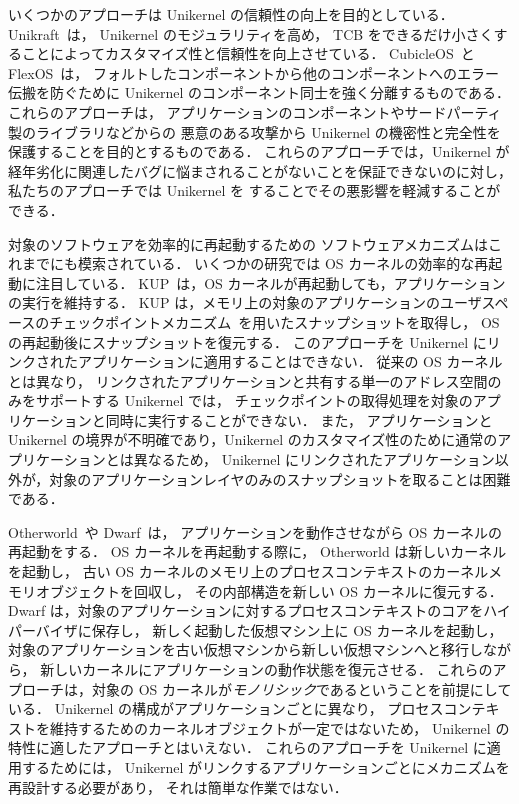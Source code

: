 いくつかのアプローチは Unikernel の信頼性の向上を目的としている．
Unikraft~\cite{KuenzerEtAl-Unikraft}は，
Unikernel のモジュラリティを高め，
TCB をできるだけ小さくすることによってカスタマイズ性と信頼性を向上させている．
CubicleOS~\cite{SartakovEtAl-ASPLOS21}と FlexOS~\cite{LefeuvreEtAl-FlexOS}は，
フォルトしたコンポーネントから他のコンポーネントへのエラー伝搬を防ぐために
Unikernel のコンポーネント同士を強く分離するものである．
これらのアプローチは，
アプリケーションのコンポーネントやサードパーティ製のライブラリなどからの
悪意のある攻撃から Unikernel の機密性と完全性を保護することを目的とするものである．
これらのアプローチでは，Unikernel が経年劣化に関連したバグに悩まされることがないことを保証できないのに対し，
私たちのアプローチでは Unikernel を \rr することでその悪影響を軽減することができる．


対象のソフトウェアを効率的に再起動するための
ソフトウェアメカニズムはこれまでにも模索されている．
いくつかの研究では OS カーネルの効率的な再起動に注目している．
KUP~\cite{KashyapEtAl-KUP}は，OS カーネルが再起動しても，アプリケーションの実行を維持する．
KUP は，メモリ上の対象のアプリケーションのユーザスペースのチェックポイントメカニズム~\cite{CRIU}を用いたスナップショットを取得し，
OS の再起動後にスナップショットを復元する．
このアプローチを Unikernel にリンクされたアプリケーションに適用することはできない．
従来の OS カーネルとは異なり，
リンクされたアプリケーションと共有する単一のアドレス空間のみをサポートする Unikernel では，
チェックポイントの取得処理を対象のアプリケーションと同時に実行することができない．
また，
アプリケーションと Unikernel の境界が不明確であり，Unikernel のカスタマイズ性のために通常のアプリケーションとは異なるため，
Unikernel にリンクされたアプリケーション以外が，対象のアプリケーションレイヤのみのスナップショットを取ることは困難である．


Otherworld~\cite{DepoutovitchEtAl-otherworld}や Dwarf~\cite{TeradaEtAl-Dwarf}は，
アプリケーションを動作させながら OS カーネルの再起動をする．
OS カーネルを再起動する際に，
Otherworld は新しいカーネルを起動し，
古い OS カーネルのメモリ上のプロセスコンテキストのカーネルメモリオブジェクトを回収し，
その内部構造を新しい OS カーネルに復元する．
Dwarf は，対象のアプリケーションに対するプロセスコンテキストのコアをハイパーバイザに保存し，
新しく起動した仮想マシン上に OS カーネルを起動し，
対象のアプリケーションを古い仮想マシンから新しい仮想マシンへと移行しながら，
新しいカーネルにアプリケーションの動作状態を復元させる．
これらのアプローチは，対象の OS カーネルが\emph{モノリシック}であるということを前提にしている．
Unikernel の構成がアプリケーションごとに異なり，
プロセスコンテキストを維持するためのカーネルオブジェクトが一定ではないため，
Unikernel の特性に適したアプローチとはいえない．
これらのアプローチを Unikernel に適用するためには，
Unikernel がリンクするアプリケーションごとにメカニズムを再設計する必要があり，
それは簡単な作業ではない．


